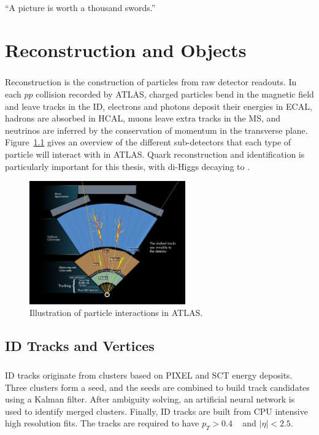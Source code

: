 \begin{savequote}[75mm]
“A picture is worth a thousand swords.”
\end{savequote}

\chapter{Reconstruction and Objects}

\paragraph{}
Reconstruction is the construction of particles from raw detector readouts. 
In each $pp$ collision recorded by ATLAS, charged particles bend in the magnetic field and leave tracks in the ID, electrons and photons deposit their energies in ECAL, hadrons are absorbed in HCAL, muons leave extra tracks in the MS, and neutrinos are inferred by the conservation of momentum in the transverse plane. 
Figure~\ref{fig:obj_reco_overview} gives an overview of the different sub-detectors that each type of particle will interact with in ATLAS. Quark reconstruction and identification is particularly important for this thesis, with di-Higgs decaying to \bbbb.

\begin{figure}[h!]
  \centering
  \captionsetup{justification=centering}
  \includegraphics[width=0.6\textwidth]{figures/detector/ATLAS_particle}
   \caption{Illustration of particle interactions in ATLAS.}
  \label{fig:obj_reco_overview}
\end{figure}

\section{ID Tracks and Vertices}
\paragraph{}
ID tracks originate from clusters based on PIXEL and SCT energy deposits.
Three clusters form a seed, and the seeds are combined to build track candidates using a Kalman filter. 
After ambiguity solving, an artificial neural network is used to identify merged clusters.
Finally, ID tracks are built from CPU intensive high resolution fits.
The tracks are required to have $p_T > 0.4$ \GeV~ and $|\eta| < 2.5$.

